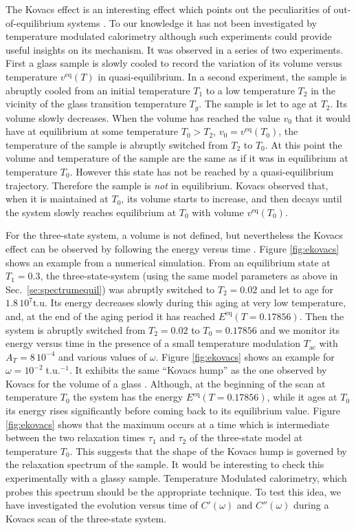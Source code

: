 \documentclass[pre,a4paper,twocolumn,superscriptaddress,%
floatfix]{revtex4}
\newcommand{\tac}{\ensuremath{T_{\mathrm{ac}}}}
\newcommand{\dtac}{\ensuremath{A_T}}
\begin{document}
The Kovacs effect is an interesting effect which points out the peculiarities
of out-of-equilibrium systems \cite{KOVACS}.
To our knowledge it has not been investigated
by temperature modulated calorimetry although such experiments could provide
useful insights 
on its mechanism. It was observed in a series of two experiments. First a
glass sample is slowly cooled to record the variation of its volume versus
temperature $v^{\mathrm{eq}}(T)$ in quasi-equilibrium. In a second experiment,
the sample is abruptly cooled from an initial temperature $T_1$ to a
low temperature $T_2$ in the vicinity of the glass transition
temperature $T_g$. The sample is let to age at $T_2$. Its volume slowly
decreases. When the volume has reached the value $v_0$ that it would have at
equilibrium at some temperature $T_0 > T_2$, $v_0 = v^{\mathrm{eq}}(T_0)$, the
temperature of the sample is abruptly switched from $T_2$ to $T_0$. At this
point the volume and temperature of the sample are the same as if it
was in equilibrium at temperature $T_0$. However this state has not be
reached by a quasi-equilibrium trajectory. Therefore the sample is {\em not} in
equilibrium. Kovacs observed that, when it is maintained
at $T_0$, its volume
starts to increase, and then decays until the system slowly reaches
equilibrium at $T_0$ with volume $v^{\mathrm{eq}}(T_0)$.

\medskip
For the three-state system, a volume is not defined, but nevertheless 
the Kovacs effect can be observed by following the energy versus time \cite{PG}.
Figure \ref{fig:ekovacs} shows an example from a numerical
simulation. From an equilibrium state at $T_1 = 0.3$, the three-state-system
(using the same model parameters as above in Sec.~\ref{se:spectrumequil}) was
abruptly switched to $T_2 = 0.02$ and let to age for $1.8\,10^7$t.u.
Its energy decreases slowly during this aging at very low temperature, and, at
the end of the aging period it has reached $E^{\mathrm{eq}}(T=0.17856)$.
Then the system is abruptly switched from $T_2 = 0.02$ to $T_0 = 0.17856$ and
we monitor its energy versus time in the presence of a small temperature
modulation $\tac$ with $\dtac = 8\,10^{-4}$ and various values of $\omega$.
Figure \ref{fig:ekovacs} shows an example for $\omega = 10^{-2}\;$t.u.$^{-1}$.
It exhibits the same ``Kovacs hump'' as the one observed by Kovacs for the
volume of a glass \cite{KOVACS}. Although, at the beginning of the scan at
temperature $T_0$ the system has the energy $E^{\mathrm{eq}}(T=0.17856)$,
while it ages at $T_0$ its energy rises significantly before coming back to
its equilibrium value. Figure \ref{fig:ekovacs} shows that the maximum occurs
at a time which is intermediate between the two relaxation times
$\tau_1$ and $\tau_2$ of the three-state model at temperature $T_0$. This
suggests that the shape of the Kovacs hump is governed by the relaxation
spectrum of the sample. It would be interesting to check this experimentally
with a glassy sample. Temperature Modulated calorimetry, which probes this
spectrum should 
be the appropriate technique. To test this idea, we have investigated the
evolution versus time of $C'(\omega)$ and $C''(\omega)$ during a Kovacs scan
of the three-state system.
\end{document}
